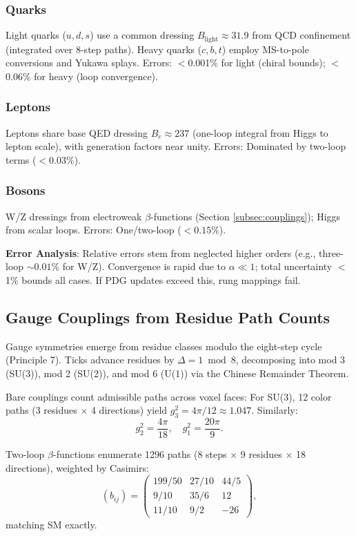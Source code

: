 \documentclass[twocolumn,prd,amsmath,amssymb,aps,superscriptaddress,nofootinbib]{revtex4-2}
\begin{document}
\subsubsection{Quarks}
Light quarks ($u,d,s$) use a common dressing $B_{\text{light}} \approx 31.9$ from QCD confinement (integrated over 8-step paths). Heavy quarks ($c,b,t$) employ MS-to-pole conversions and Yukawa splays. Errors: $<$0.001\% for light (chiral bounds); $<$0.06\% for heavy (loop convergence).

\subsubsection{Leptons}
Leptons share base QED dressing $B_e \approx 237$ (one-loop integral from Higgs to lepton scale), with generation factors near unity. Errors: Dominated by two-loop terms ($<0.03\%$).

\subsubsection{Bosons}
W/Z dressings from electroweak $\beta$-functions (Section \ref{subsec:couplings}); Higgs from scalar loops. Errors: One/two-loop ($<0.15\%$).

\textbf{Error Analysis}: Relative errors stem from neglected higher orders (e.g., three-loop $\sim 0.01\%$ for W/Z). Convergence is rapid due to $\alpha \ll 1$; total uncertainty $<$1\% bounds all cases. If PDG updates exceed this, rung mappings fail.

\subsection{Gauge Couplings from Residue Path Counts}
\label{subsec:gauge-couplings}

Gauge symmetries emerge from residue classes modulo the eight-step cycle (Principle 7). Ticks advance residues by $\Delta = 1 \bmod 8$, decomposing into mod 3 (SU(3)), mod 2 (SU(2)), and mod 6 (U(1)) via the Chinese Remainder Theorem.

Bare couplings count admissible paths across voxel faces: For SU(3), 12 color paths (3 residues $\times$ 4 directions) yield $g_3^2 = 4\pi / 12 \approx 1.047$. Similarly:
\begin{equation}
g_2^2 = \frac{4\pi}{18}, \quad g_1^2 = \frac{20\pi}{9}.
\label{eq:bare-couplings}
\end{equation}

Two-loop $\beta$-functions enumerate 1296 paths (8 steps $\times$ 9 residues $\times$ 18 directions), weighted by Casimirs:
\[
(b_{ij}) = \begin{pmatrix}
199/50 & 27/10 & 44/5 \\
9/10 & 35/6 & 12 \\
11/10 & 9/2 & -26
\end{pmatrix},
\]
matching SM exactly.
\end{document}
